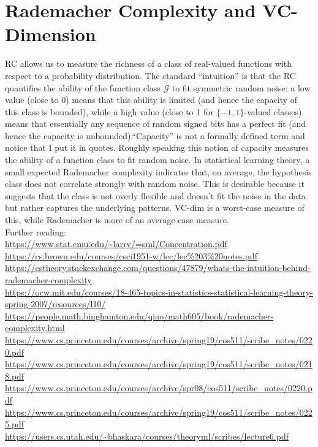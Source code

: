 \chapter{Rademacher Complexity and VC-Dimension}
\begin{flushleft}
	RC allows us to measure the richness of a class of real-valued
	functions with respect to a probability distribution. The standard
	``intuition'' is that the RC quantifies the ability of the
	function class $\mathcal{G}$ to fit symmetric random noise: a low value
	(close to 0) means
	that this ability is limited (and hence the capacity of this class is
	bounded), while a high value (close to 1 for $\{-1,1\}$-valued
	classes) means that essentially any sequence of random signed
	bits has a perfect fit (and hence the capacity is unbounded).``Capacity''
	is not a formally defined term and notice that I put it in quotes.
	Roughly
	speaking this notion of capacity measures the ability of a function
	class to fit random noise. In statistical learning theory, a small expected Rademacher complexity indicates that, on average,
	the hypothesis class does not correlate strongly with random noise. This is desirable because
	it suggests that the class is not overly flexible and doesn't fit the noise in the data but rather captures the underlying patterns.
	VC-dim is a worst-case measure of this, while Rademacher is more of an
	average-case measure.\\
	Further reading:\\

	\url{https://www.stat.cmu.edu/~larry/=sml/Concentration.pdf} %
	\url{https://cs.brown.edu/courses/csci1951-w/lec/lec%203%20notes.pdf} %
	\url{https://cstheory.stackexchange.com/questions/47879/whats-the-intuition-behind-rademacher-complexity}\\
	\url{https://ocw.mit.edu/courses/18-465-topics-in-statistics-statistical-learning-theory-spring-2007/resources/l10/}\\
	\url{https://people.math.binghamton.edu/qiao/math605/book/rademacher-complexity.html}\\
	\url{https://www.cs.princeton.edu/courses/archive/spring19/cos511/scribe_notes/0220.pdf}\\
	\url{https://www.cs.princeton.edu/courses/archive/spring19/cos511/scribe_notes/0218.pdf}\\
	\url{https://www.cs.princeton.edu/courses/archive/spr08/cos511/scribe_notes/0220.pdf} \\ %
	\url{https://www.cs.princeton.edu/courses/archive/spring19/cos511/scribe_notes/0225.pdf}\\
	\url{https://users.cs.utah.edu/~bhaskara/courses/theoryml/scribes/lecture6.pdf}\\


\end{flushleft}
